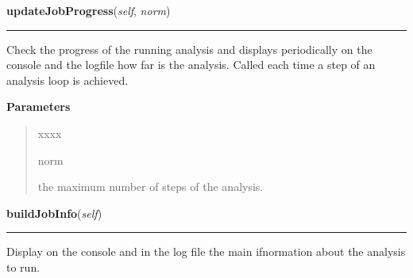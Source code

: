     \label{nMOLDYN:Analysis:Analysis:Analysis:updateJobProgress}

    \vspace{0.5ex}

\hspace{.8\funcindent}\begin{boxedminipage}{\funcwidth}

    \raggedright \textbf{updateJobProgress}(\textit{self}, \textit{norm})

    \vspace{-1.5ex}

    \rule{\textwidth}{0.5\fboxrule}
\setlength{\parskip}{2ex}
    Check the progress of the running analysis and displays periodically on
    the console and the logfile how far is the analysis. Called each time a
    step of an analysis loop is achieved.

\setlength{\parskip}{1ex}
      \textbf{Parameters}
      \vspace{-1ex}

      \begin{quote}
        \begin{Ventry}{xxxx}

          \item[norm]

          the maximum number of steps of the analysis.

        \end{Ventry}

      \end{quote}

    \end{boxedminipage}

    \label{nMOLDYN:Analysis:Analysis:Analysis:buildJobInfo}

    \vspace{0.5ex}

\hspace{.8\funcindent}\begin{boxedminipage}{\funcwidth}

    \raggedright \textbf{buildJobInfo}(\textit{self})

    \vspace{-1.5ex}

    \rule{\textwidth}{0.5\fboxrule}
\setlength{\parskip}{2ex}
    Display on the console and in the log file the main ifnormation about 
    the analysis to run.

\setlength{\parskip}{1ex}
    \end{boxedminipage}

